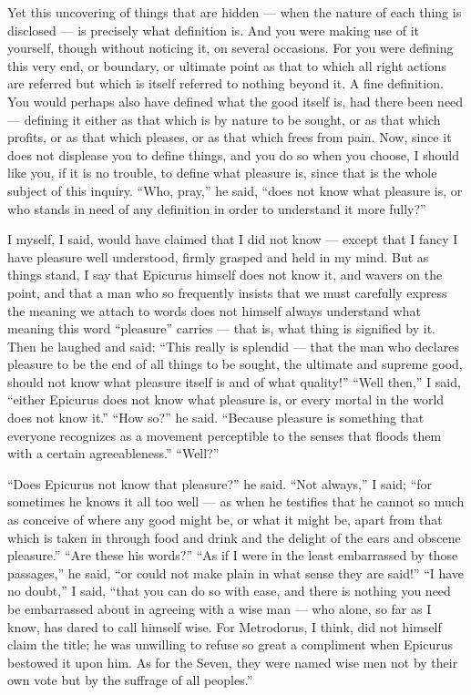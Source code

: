  Yet this uncovering of things that are hidden — when the nature of each thing is disclosed — is precisely what definition is. And you were making use of it yourself, though without noticing it, on several occasions. For you were defining this very end, or boundary, or ultimate point as that to which all right actions are referred but which is itself referred to nothing beyond it. A fine definition. You would perhaps also have defined what the good itself is, had there been need — defining it either as that which is by nature to be sought, or as that which profits, or as that which pleases, or as that which frees from pain. Now, since it does not displease you to define things, and you do so when you choose, I should like you, if it is no trouble, to define what pleasure is, since that is the whole subject of this inquiry. ``Who, pray,'' he said, ``does not know what pleasure is, or who stands in need of any definition in order to understand it more fully?''

 I myself, I said, would have claimed that I did not know — except that I fancy I have pleasure well understood, firmly grasped and held in my mind. But as things stand, I say that Epicurus himself does not know it, and wavers on the point, and that a man who so frequently insists that we must carefully express the meaning we attach to words does not himself always understand what meaning this word ``pleasure'' carries — that is, what thing is signified by it. Then he laughed and said: ``This really is splendid — that the man who declares pleasure to be the end of all things to be sought, the ultimate and supreme good, should not know what pleasure itself is and of what quality!'' ``Well then,'' I said, ``either Epicurus does not know what pleasure is, or every mortal in the world does not know it.'' ``How so?'' he said. ``Because pleasure is something that everyone recognizes as a movement perceptible to the senses that floods them with a certain agreeableness.'' ``Well?''

 ``Does Epicurus not know that pleasure?'' he said. ``Not always,'' I said; ``for sometimes he knows it all too well — as when he testifies that he cannot so much as conceive of where any good might be, or what it might be, apart from that which is taken in through food and drink and the delight of the ears and obscene pleasure.'' ``Are these his words?'' ``As if I were in the least embarrassed by those passages,'' he said, ``or could not make plain in what sense they are said!'' ``I have no doubt,'' I said, ``that you can do so with ease, and there is nothing you need be embarrassed about in agreeing with a wise man — who alone, so far as I know, has dared to call himself wise. For Metrodorus, I think, did not himself claim the title; he was unwilling to refuse so great a compliment when Epicurus bestowed it upon him. As for the Seven, they were named wise men not by their own vote but by the suffrage of all peoples.''

